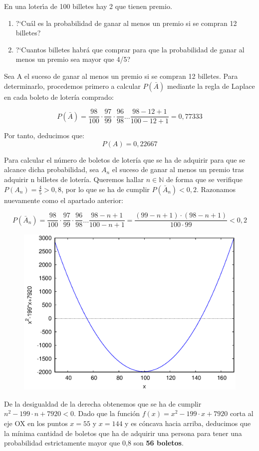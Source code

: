 \problem

En una loter{\'\i}a de 100 billetes hay 2 que tienen premio.
\begin{enumerate}
	\item ?`Cu{\'a}l es la probabilidad de ganar al menos un premio si  se  compran
	12 billetes?
	\item ?`Cuantos billetes habr{\'a} que comprar  para  que  la  probabilidad  de
	ganar al menos un  premio sea mayor que 4/5?
\end{enumerate}

\subproblem
Sea A el suceso de ganar al menos un premio si se compran 12 billetes. Para determinarlo, procedemos primero a calcular $P(\bar A)$ mediante la regla de Laplace en cada boleto de lotería comprado:
	
	$$
		P(\bar A) = \frac{98}{100}·\frac{97}{99}·\frac{96}{98}...\frac{98-12+1}{100-12+1} = 0,77333
	$$
	
	Por tanto, deducimos que: 
	$$
	 P(A) = 0,22667 
	$$
	
	\subproblem
	
	Para calcular el número de boletos de lotería que se ha de adquirir para que se alcance dicha probabilidad, sea $A_n$ el suceso de ganar al menos un premio tras adquirir n billetes de lotería. Queremos hallar $n \in \mathbb{N}$ de forma que se verifique $P(A_n) = \frac{4}{5} > 0,8$, por lo que 
	se ha de cumplir $P(\bar A_n) < 0,2$. Razonamos nuevamente como el apartado anterior:
	
	$$
	P(\bar A_n) = \frac{98}{100}·\frac{97}{99}·\frac{96}{98}...\frac{98-n+1}{100-n+1} = \frac{(99-n+1)·(98-n+1)}{100·99} < 0,2
	$$

	\begin{figure}[h]
		\centering
		\includegraphics[scale=0.40]{ejercicio-6-grafica.eps}
	\end{figure}
	
		
	
	De la desigualdad de la derecha obtenemos que se ha de cumplir $n^2 -199·n + 7920 < 0$. Dado que la función $f(x) = x^2 -199·x + 7920$ corta al eje OX en los puntos $x=55$ y $x=144$ y es cóncava hacia arriba, deducimos que la mínima cantidad de boletos que ha de adquirir una persona para tener una probabilidad estrictamente mayor que 0,8 son \textbf{56 boletos}.